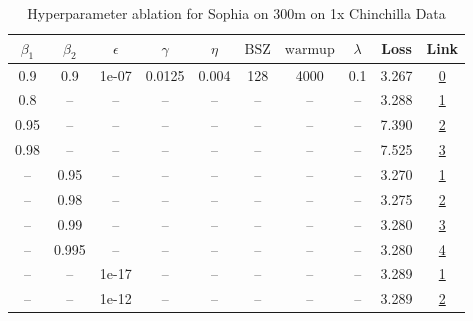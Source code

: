 \begin{table}[H]
\centering
\caption{Hyperparameter ablation for Sophia on 300m on 1x Chinchilla Data}
\label{tab:ablation_sophia_300m_on_1x_chinchilla_data}
\begin{tabular}{cccccccccc}
\toprule
$\beta_1$ & $\beta_2$ & $\epsilon$ & $\gamma$ & $\eta$ & $\mathrm{BSZ}$ & $\mathrm{warmup}$ & $\lambda$ & Loss & Link \\
\midrule
0.9 & 0.9 & 1e-07 & 0.0125 & 0.004 & 128 & 4000 & 0.1 & 3.267 & \href{https://wandb.ai/marin-community/optimizer-scaling/runs/sweep-300m-6B-sophiafff382flr0.004-wd0.1-minlr0-warmup4000-b10.9-f1648d}{0} \\
\midrule
0.8 & -- & -- & -- & -- & -- & -- & -- & 3.288 & \href{https://wandb.ai/marin-community/optimizer-scaling/runs/sweep-300m-6B-sophiaf8a1eb4lr0.004-wd0.1-minlr0-warmup4000-b10.8-b88dc2}{1} \\
0.95 & -- & -- & -- & -- & -- & -- & -- & 7.390 & \href{https://wandb.ai/marin-community/optimizer-scaling/runs/sweep-300m-6B-sophia727e1alr0.004-wd0.1-minlr0-warmup4000-b10.95-6fbf63}{2} \\
0.98 & -- & -- & -- & -- & -- & -- & -- & 7.525 & \href{https://wandb.ai/marin-community/optimizer-scaling/runs/sweep-300m-6B-sophiaf5a4caalr0.004-wd0.1-minlr0-warmup4000-b10.9-3b3a58}{3} \\
-- & 0.95 & -- & -- & -- & -- & -- & -- & 3.270 & \href{https://wandb.ai/marin-community/optimizer-scaling/runs/sweep-300m-6B-sophiaf5093aclr0.004-wd0.1-minlr0-warmup4000-b10.9-f76ba7}{1} \\
-- & 0.98 & -- & -- & -- & -- & -- & -- & 3.275 & \href{https://wandb.ai/marin-community/optimizer-scaling/runs/sweep-300m-6B-sophiaqd032adlr0.004-wd0.1-minlr0-warmup4000-b10.9-2f3128}{2} \\
-- & 0.99 & -- & -- & -- & -- & -- & -- & 3.280 & \href{https://wandb.ai/marin-community/optimizer-scaling/runs/sweep-300m-6B-sophiaff4bc42lr0.004-wd0.1-minlr0-warmup4000-b10.9-3cffe0}{3} \\
-- & 0.995 & -- & -- & -- & -- & -- & -- & 3.280 & \href{https://wandb.ai/marin-community/optimizer-scaling/runs/sweep-300m-6B-sophiaf602b10lr0.004-wd0.1-minlr0-warmup4000-b10.9-9d3420}{4} \\
-- & -- & 1e-17 & -- & -- & -- & -- & -- & 3.289 & \href{https://wandb.ai/marin-community/optimizer-scaling/runs/sweep-300m-6B-sophia145319lr0.004-wd0.1-minlr0-warmup4000-b10.9--aa98b0}{1} \\
-- & -- & 1e-12 & -- & -- & -- & -- & -- & 3.289 & \href{https://wandb.ai/marin-community/optimizer-scaling/runs/sweep-300m-6B-sophiaf6afd56lr0.004-wd0.1-minlr0-warmup4000-b10.9-c96ddc}{2} \\

\end{tabular}
\end{table}
